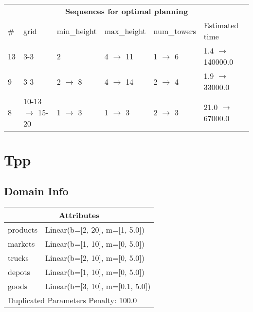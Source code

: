 \documentclass{article}
\begin{document}
                            \begin{center}
                            \begin{tabular}{l|l|l|l|l|l}
                            \multicolumn{6}{c}{\bf \large Sequences for optimal planning}\\
                            \# & grid & min\_height & max\_height & num\_towers & Estimated time\\\midrule
                            13&3-3&2&4 $\rightarrow$ 11&1 $\rightarrow$ 6&1.4 $\rightarrow$ 140000.0\\
9&3-3&2 $\rightarrow$ 8&4 $\rightarrow$ 14&2 $\rightarrow$ 4&1.9 $\rightarrow$ 33000.0\\
8&10-13 $\rightarrow$ 15-20&1 $\rightarrow$ 3&1 $\rightarrow$ 3&2 $\rightarrow$ 3&21.0 $\rightarrow$ 67000.0
                            \end{tabular}
                            \end{center}
                    \newpage \section{Tpp}
                    \subsection*{Domain Info}

                    \begin{center}
                    \begin{tabular}{p{}p{}}
                    \multicolumn{2}{c}{\bf \large Attributes}\\\midrule
                    products & Linear(b=[2, 20], m=[1, 5.0])\\
markets & Linear(b=[1, 10], m=[0, 5.0])\\
trucks & Linear(b=[2, 10], m=[0, 5.0])\\
depots & Linear(b=[1, 10], m=[0, 5.0])\\
goods & Linear(b=[3, 10], m=[0.1, 5.0])
                    
                     \\\midrule
                    \multicolumn{2}{l}{Duplicated Parameters Penalty: 100.0}
                    \end{tabular}
                    \end{center}
                
\end{document}
